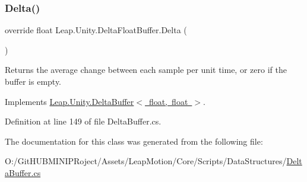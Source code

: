 \subsubsection{\texorpdfstring{Delta()}{Delta()}}
{\footnotesize\ttfamily override float Leap.\+Unity.\+Delta\+Float\+Buffer.\+Delta (\begin{DoxyParamCaption}{ }\end{DoxyParamCaption})\hspace{0.3cm}{\ttfamily [virtual]}}



Returns the average change between each sample per unit time, or zero if the buffer is empty. 



Implements \mbox{\hyperlink{class_leap_1_1_unity_1_1_delta_buffer_a8700bc7a1676ba39977f58debf74f5df}{Leap.\+Unity.\+Delta\+Buffer$<$ float, float $>$}}.



Definition at line 149 of file Delta\+Buffer.\+cs.



The documentation for this class was generated from the following file\+:\begin{DoxyCompactItemize}
\item 
O\+:/\+Git\+H\+U\+B\+M\+I\+N\+I\+P\+Roject/\+Assets/\+Leap\+Motion/\+Core/\+Scripts/\+Data\+Structures/\mbox{\hyperlink{_delta_buffer_8cs}{Delta\+Buffer.\+cs}}\end{DoxyCompactItemize}
